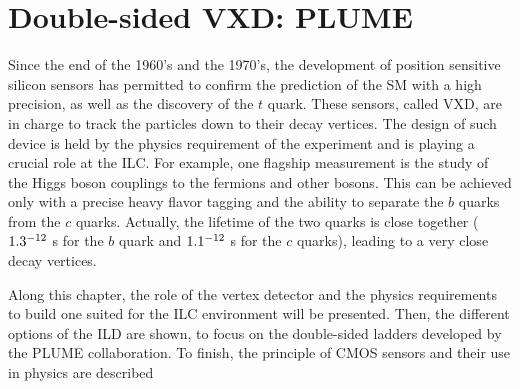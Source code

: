 \chapter{Double-sided VXD: PLUME}
\label{chap:vxd}
  
  Since the end of the 1960's and the 1970's, the development of position sensitive silicon sensors has permitted to confirm the prediction of the \acrfull{SM} with a high precision, as well as the discovery of the $t$ quark.
  These sensors, called \acrfull{VXD}, are in charge to track the particles down to their decay vertices.
  The design of such device is held by the physics requirement of the experiment and is playing a crucial role at the \acrfull{ILC}.
  For example, one flagship measurement is the study of the Higgs boson couplings to the fermions and other bosons.
  This can be achieved only with a precise heavy flavor tagging and the ability to separate the $b$ quarks from the $c$ quarks. 
  Actually, the lifetime of the two quarks is close together ($1.3 \time 10^{-12}$ s for the $b$ quark and $1.1 \time 10^{-12}$ s for the $c$ quarks), leading to a very close decay vertices. 
  
  Along this chapter, the role of the vertex detector and the physics requirements to build one suited for the \gls{ILC} environment will be presented.
  Then, the different options of the \acrfull{ILD} are shown, to focus on the double-sided ladders developed by the \gls{PLUME} collaboration.
  To finish, the principle of \gls{CMOS} sensors and their use in physics are described



